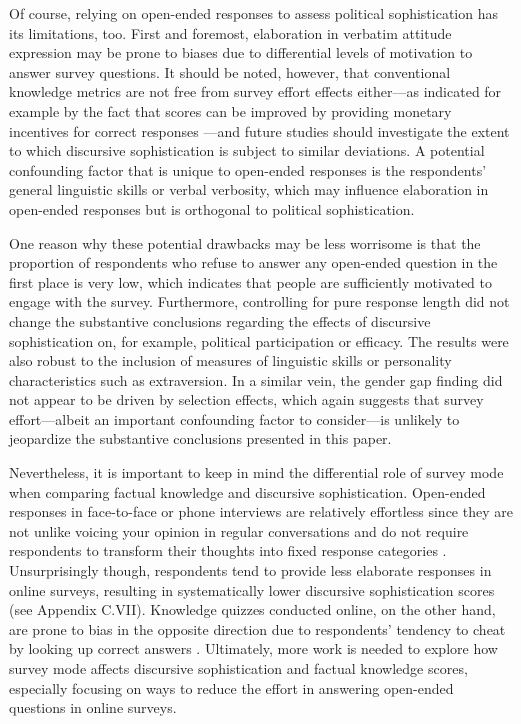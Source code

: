 Of course, relying on open-ended responses to assess political sophistication has its limitations, too. First and foremost, elaboration in verbatim attitude expression may be prone to biases due to differential levels of motivation to answer survey questions. It should be noted, however, that conventional knowledge metrics are not free from survey effort effects either---as indicated for example by the fact that scores can be improved by providing monetary incentives for correct responses \citep{prior2008money}---and future studies should investigate the extent to which discursive sophistication is subject to similar deviations. A potential confounding factor that is unique to open-ended responses is the respondents' general linguistic skills or verbal verbosity, which may influence elaboration in open-ended responses but is orthogonal to political sophistication.

One reason why these potential drawbacks may be less worrisome is that the proportion of respondents who refuse to answer any open-ended question in the first place is very low, which indicates that people are sufficiently motivated to engage with the survey. Furthermore, controlling for pure response length did not change the substantive conclusions regarding the effects of discursive sophistication on, for example, political participation or efficacy. The results were also robust to the inclusion of measures of linguistic skills or personality characteristics such as extraversion. In a similar vein, the gender gap finding did not appear to be driven by selection effects, which again suggests that survey effort---albeit an important confounding factor to consider---is unlikely to jeopardize the substantive conclusions presented in this paper.

Nevertheless, it is important to keep in mind the differential role of survey mode when comparing factual knowledge and discursive sophistication. Open-ended responses in face-to-face or phone interviews are relatively effortless since they are not unlike voicing your opinion in regular conversations and do not require respondents to transform their thoughts into fixed response categories \citep[e.g.,][]{sudman1996thinking}. Unsurprisingly though, respondents tend to provide less elaborate responses in online surveys, resulting in systematically lower discursive sophistication scores (see Appendix C.VII). Knowledge quizzes conducted online, on the other hand, are prone to bias in the opposite direction due to respondents' tendency to cheat by looking up correct answers \citep{clifford2016cheating}. Ultimately, more work is needed to explore how survey mode affects discursive sophistication and factual knowledge scores, especially focusing on ways to reduce the effort in answering open-ended questions in online surveys.

